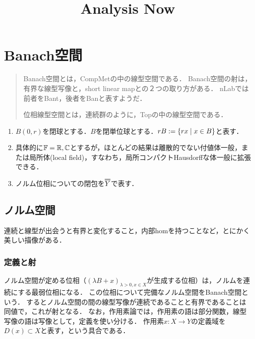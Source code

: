 \documentclass[uplatex,dvipdfmx]{jsreport}
\title{Analysis Now}
\author{}
\begin{document}
\tableofcontents

\chapter{Banach空間}

\begin{quotation}
    Banach空間とは，CompMetの中の線型空間である．
    Banach空間の射は，有界な線型写像と，short linear mapとの２つの取り方がある．
    nLabでは前者をBant，後者をBanと表すようだ．

    位相線型空間とは，連続群のように，Topの中の線型空間である．
\end{quotation}

\begin{notation}\mbox{}
    \begin{enumerate}
        \item $B(0,r)$を閉球とする．$B$を閉単位球とする．$rB:=\left\{rx\mid x\in B\right\}$と表す．
        \item 具体的に$\mathbb{F}=\mathbb{R},\mathbb{C}$とするが，ほとんどの結果は離散的でない付値体一般，または局所体(local field)，すなわち，局所コンパクトHausdorffな体一般に拡張できる．
        \item ノルム位相についての閉包を$\dbloverline{Y}$で表す．
    \end{enumerate}
\end{notation}

\section{ノルム空間}

\begin{tcolorbox}[colframe=ForestGreen, colback=ForestGreen!10!white,breakable,colbacktitle=ForestGreen!40!white,coltitle=black,fonttitle=\bfseries\sffamily,
title=]
    連続と線型が出会うと有界と変化すること，内部homを持つことなど，とにかく美しい描像がある．
\end{tcolorbox}

\subsection{定義と射}

\begin{tcolorbox}[colframe=ForestGreen, colback=ForestGreen!10!white,breakable,colbacktitle=ForestGreen!40!white,coltitle=black,fonttitle=\bfseries\sffamily,
title=]
    ノルム空間が定める位相（$(\lambda B+x)_{\lambda>0,x\in X}$が生成する位相）は，ノルムを連続にする最弱位相になる．
    この位相について完備なノルム空間をBanach空間という．
    するとノルム空間の間の線型写像が連続であることと有界であることは同値で，これが射となる．
    なお，作用素論では，作用素の語は部分関数，線型写像の語は写像として，定義を使い分ける．
    作用素$x:X\to Y$の定義域を$D(x)\subset X$と表す，という具合である．
\end{tcolorbox}
\end{document}
